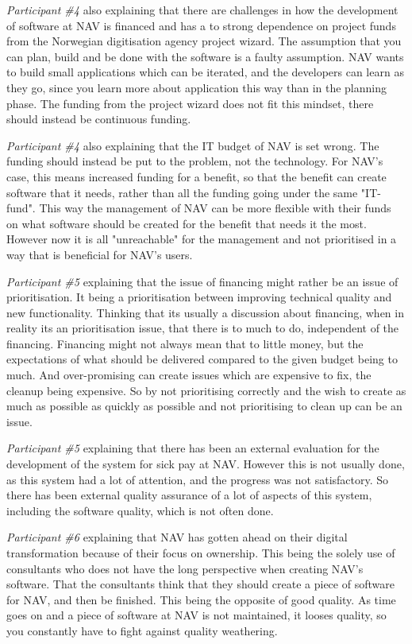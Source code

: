 \textit{Participant \#4} also explaining that there are challenges in how the development of software at NAV is financed and has a to strong dependence on project funds from the Norwegian digitisation agency project wizard. The assumption that you can plan, build and be done with the software is a faulty assumption. NAV wants to build small applications which can be iterated, and the developers can learn as they go, since you learn more about application this way than in the planning phase. The funding from the project wizard does not fit this mindset, there should instead be continuous funding.

\textit{Participant \#4} also explaining that the IT budget of NAV is set wrong. The funding should instead be put to the problem, not the technology. For NAV's case, this means increased funding for a benefit, so that the benefit can create software that it needs, rather than all the funding going under the same "IT-fund". This way the management of NAV can be more flexible with their funds on what software should be created for the benefit that needs it the most. However now it is all "unreachable" for the management and not prioritised in a way that is beneficial for NAV's users.

\textit{Participant \#5} explaining that the issue of financing might rather be an issue of prioritisation. It being a prioritisation between improving technical quality and new functionality. Thinking that its usually a discussion about financing, when in reality its an prioritisation issue, that there is to much to do, independent of the financing. Financing might not always mean that to little money, but the expectations of what should be delivered compared to the given budget being to much. And over-promising can create issues which are expensive to fix, the cleanup being expensive. So by not prioritising correctly and the wish to create as much as possible as quickly as possible and not prioritising to clean up can be an issue.

\textit{Participant \#5} explaining that there has been an external evaluation for the development of the system for sick pay at NAV. However this is not usually done, as this system had a lot of attention, and the progress was not satisfactory. So there has been external quality assurance of a lot of aspects of this system, including the software quality, which is not often done.

\textit{Participant \#6} explaining that NAV has gotten ahead on their digital transformation because of their focus on ownership. This being the solely use of consultants who does not have the long perspective when creating NAV's software. That the consultants think that they should create a piece of software for NAV, and then be finished. This being the opposite of good quality. As time goes on and a piece of software at NAV is not maintained, it looses quality, so you constantly have to fight against quality weathering.

